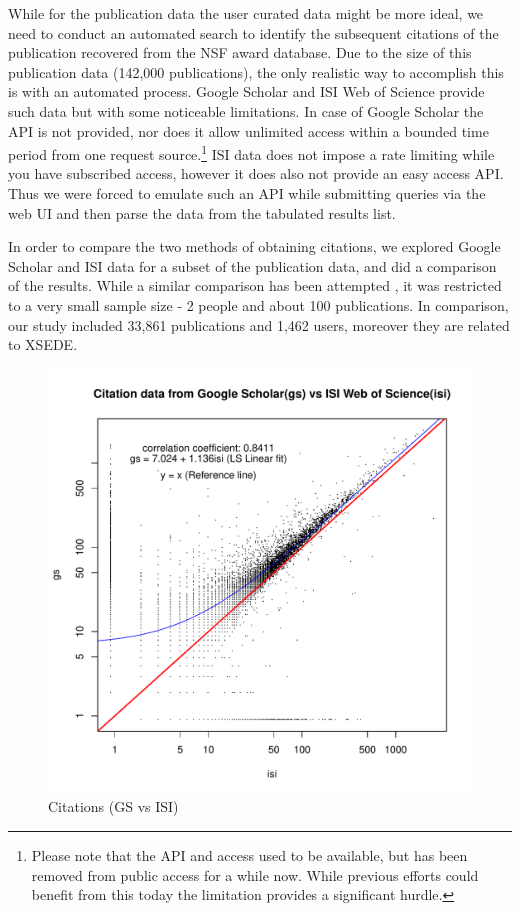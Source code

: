 \documentclass{sig-alternate}
\begin{document}
While for the publication data the user curated data might be more ideal, we need to conduct an automated search to identify the subsequent citations of the publication recovered from the NSF award database. 
Due to the size of this publication data (142,000 publications), the only realistic way to accomplish this is with an automated process. Google Scholar and ISI Web of Science provide such data but with some noticeable limitations. In case of Google Scholar the API is not provided, nor does it allow unlimited access within a bounded time period from one request source.\footnote{Please note that the API and access used to be available, but has been removed from public access for a while now. While previous efforts could benefit from this today the limitation provides a significant hurdle.} ISI data does not impose a rate limiting while you have subscribed access, however it does also not provide an easy access API. Thus we were forced to emulate such an API while submitting queries via the web UI and then parse the data from the tabulated results list. 
 
In order to compare the two methods of obtaining citations, we explored Google Scholar and ISI data for a subset of the publication data, and did a comparison of the results. While a similar comparison has been attempted \cite{yang2006citation}, it was restricted to a very small sample size - 2 people and about 100 publications. In comparison, our study included 33,861 publications and 1,462 users, moreover they are related to XSEDE.
 
\begin{figure}[htb] 
  \centering 
    \includegraphics[width=1.0\columnwidth]{images/11_gs_vs_isi_cites.pdf} 
  \caption{Citations (GS vs ISI)}\label{F:gs-vs-isi-cites} 
\end{figure} 
 
\end{document}
